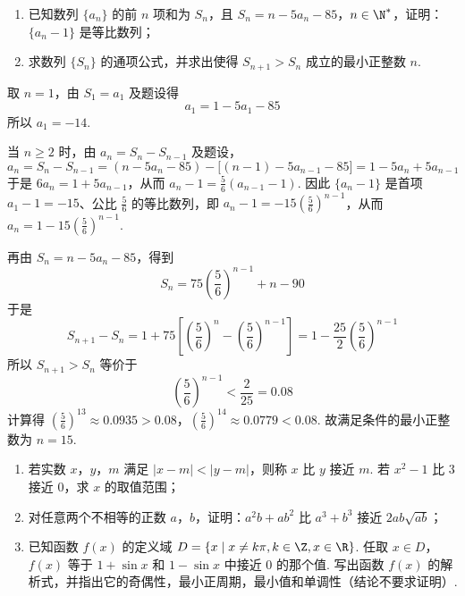 \begin{problem}
\begin{enumerate}
\item 已知数列 \(\{a_{n}\}\) 的前 \(n\) 项和为 \(S_{n}\)，且 \(S_{n} = n - 5a_{n} - 85\)，\(n \in \N^*\)，证明：\(\{a_{n} - 1\}\) 是等比数列；
\item 求数列 \(\{S_{n}\}\) 的通项公式，并求出使得 \(S_{n+1} > S_{n}\) 成立的最小正整数 \(n\).
\end{enumerate}
\end{problem}

\begin{solution}
取 \(n=1\)，由 \(S_1=a_1\) 及题设得
\[
a_1=1-5a_1-85
\]
所以 \(a_1=-14\).

当 \(n\geqslant2\) 时，由 \(a_n=S_n-S_{n-1}\) 及题设，
\[
a_n=S_n-S_{n-1}=(n-5a_n-85)-\bigl[(n-1)-5a_{n-1}-85\bigr]
=1-5a_n+5a_{n-1}
\]
于是 \(6a_n=1+5a_{n-1}\)，从而 \(a_n-1=\frac56(a_{n-1}-1)\).
因此 \(\{a_n-1\}\) 是首项 \(a_1-1=-15\)、公比 \(\frac56\) 的等比数列，即
\(a_n-1=-15\left(\frac56\right)^{n-1}\)，从而
\(a_n=1-15\left(\frac56\right)^{n-1}\).

再由 \(S_n=n-5a_n-85\)，得到
\[
S_n=75\left(\frac56\right)^{n-1}+n-90
\]
于是
\[
S_{n+1}-S_n
=1+75\left[\left(\frac56\right)^n-\left(\frac56\right)^{n-1}\right]
=1-\frac{25}{2}\left(\frac56\right)^{n-1}
\]
所以 \(S_{n+1}>S_n\) 等价于
\[
\left(\frac56\right)^{n-1}<\frac{2}{25}=0.08
\]
计算得
\(\left(\frac56\right)^{13}\approx0.0935>0.08\)，\(\left(\frac56\right)^{14}\approx0.0779<0.08\).
故满足条件的最小正整数为 \(n=15\).
\end{solution}

\begin{problem}
\begin{enumerate}
\item 若实数 \(x\)，\(y\)，\(m\) 满足 \(|x - m| < |y - m|\)，则称 \(x\) 比 \(y\) 接近 \(m\). 若 \(x^{2} - 1\) 比 \(3\) 接近 \(0\)，求 \(x\) 的取值范围；
\item 对任意两个不相等的正数 \(a\)，\(b\)，证明：\(a^{2}b + ab^{2}\) 比 \(a^{3} + b^{3}\) 接近 \(2ab\sqrt{ab}\)；
\item 已知函数 \(f(x)\) 的定义域 \(D = \{x \mid x \neq k\pi, k \in \Z, x \in \R\}\). 任取 \(x \in D\)，\(f(x)\) 等于 \(1 + \sin x\) 和 \(1 - \sin x\) 中接近 \(0\) 的那个值. 写出函数 \(f(x)\) 的解析式，并指出它的奇偶性，最小正周期，最小值和单调性（结论不要求证明）.
\end{enumerate}
\end{problem}

